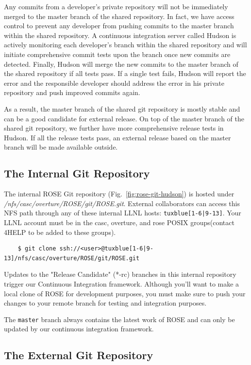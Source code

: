 Any commits from a developer's private repository will not be immediately merged to the master branch
of the shared repository. In fact, we have access control to prevent any developer from pushing commits 
to the master branch within the shared repository.
A continuous integration server called Hudson is actively monitoring each developer's branch within the shared repository 
and will initiate comprehensive commit tests upon the branch once new commits are detected.
Finally, Hudson will merge the new commits to the master branch of the shared repository if all tests pass.
If a single test fails, Hudson will report the error and the responsible developer should address the error in 
his private repository and push improved commits again. 

As a result, the master branch of the shared git repository is mostly
stable and can be a good candidate for external release. 
On top of the master branch of the shared git repository, we further have
more comprehensive release tests in Hudson. If all the release tests pass,
an external release based on the master branch will be made available
outside. 


\subsection{The Internal Git Repository}

The internal ROSE Git repository (Fig.~\ref{fig:rose-git-hudson}) is hosted under
\textit{/nfs/casc/overture/ROSE/git/ROSE.git}. External collaborators can access
this NFS path through any of these internal LLNL hosts: \texttt{tuxblue[1-6|9-13]}.
Your LLNL account must be in the casc, overture, and rose POSIX groups(contact
4HELP to be added to these groups).
\begin{verbatim}
    $ git clone ssh://<user>@tuxblue[1-6|9-13]/nfs/casc/overture/ROSE/git/ROSE.git
\end{verbatim}

Updates to the "Release Candidate" (*-rc) branches in this internal repository
trigger our Continuous Integration framework. Although you'll want to make a
local clone of ROSE for development purposes, you must make sure to push your
changes to your remote branch for testing and integration purposes.

The \texttt{master} branch always contains the latest work of ROSE and can only
be updated by our continuous integration framework.


\subsection{The External Git Repository}

